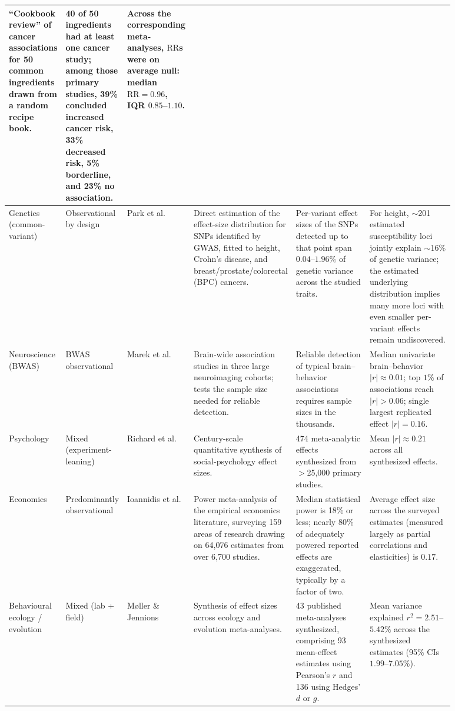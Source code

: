 {\begin{longtable}{p{0.11\linewidth} p{0.09\linewidth} p{0.11\linewidth} p{0.18\linewidth} p{0.18\linewidth} p{0.21\linewidth}}
``Cookbook review'' of cancer associations for 50 common ingredients drawn from a random recipe book. &
40 of 50 ingredients had at least one cancer study; among those primary studies, 39\% concluded increased cancer risk, 33\% decreased risk, 5\% borderline, and 23\% no association. &
Across the corresponding meta-analyses, $\mathrm{RR}$s were on average null: median $\mathrm{RR}=0.96$, IQR $0.85$--$1.10$. \\
\midrule
Genetics (common-variant) &
Observational by design &
Park et al.~\citep{park2010} &
Direct estimation of the effect-size distribution for SNPs identified by GWAS, fitted to height, Crohn's disease, and breast/prostate/colorectal (BPC) cancers. &
Per-variant effect sizes of the SNPs detected up to that point span $0.04$--$1.96\%$ of genetic variance across the studied traits. &
For height, $\sim$201 estimated susceptibility loci jointly explain $\sim$16\% of genetic variance; the estimated underlying distribution implies many more loci with even smaller per-variant effects remain undiscovered. \\
\midrule
Neuroscience (BWAS) &
BWAS observational &
Marek et al.~\citep{marek2022} &
Brain-wide association studies in three large neuroimaging cohorts; tests the sample size needed for reliable detection. &
Reliable detection of typical brain--behavior associations requires sample sizes in the thousands. &
Median univariate brain--behavior $|r|\approx 0.01$; top $1\%$ of associations reach $|r|>0.06$; single largest replicated effect $|r|=0.16$. \\
\midrule
Psychology &
Mixed (experiment-leaning) &
Richard et al.~\citep{richard2003} &
Century-scale quantitative synthesis of social-psychology effect sizes. &
474 meta-analytic effects synthesized from $>$25{,}000 primary studies. &
Mean $|r|\approx 0.21$ across all synthesized effects. \\
\midrule
Economics &
Predominantly observational &
Ioannidis et al.~\citep{ioannidis2017econ} &
Power meta-analysis of the empirical economics literature, surveying 159 areas of research drawing on 64{,}076 estimates from over 6{,}700 studies. &
Median statistical power is 18\% or less; nearly 80\% of adequately powered reported effects are exaggerated, typically by a factor of two. &
Average effect size across the surveyed estimates (measured largely as partial correlations and elasticities) is $0.17$. \\
\midrule
Behavioural ecology / evolution &
Mixed (lab + field) &
M{\o}ller \& Jennions~\citep{mollerjennions2002} &
Synthesis of effect sizes across ecology and evolution meta-analyses. &
43 published meta-analyses synthesized, comprising 93 mean-effect estimates using Pearson's $r$ and 136 using Hedges' $d$ or $g$. &
Mean variance explained $r^2 = 2.51$--$5.42\%$ across the synthesized estimates (95\% CIs $1.99$--$7.05\%$). \\
\end{longtable}
}

